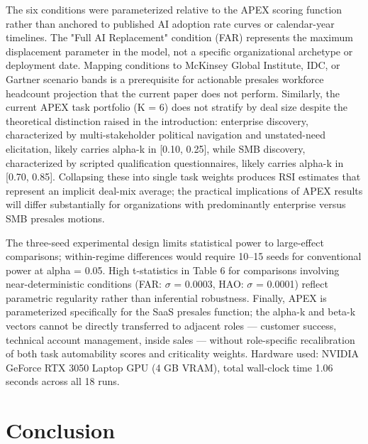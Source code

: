 \documentclass[10pt, conference]{IEEEtran}
\begin{document}
{The six conditions were parameterized relative to the APEX scoring function rather than anchored to published AI adoption rate curves or calendar-year timelines. The "Full AI Replacement" condition (FAR) represents the maximum displacement parameter in the model, not a specific organizational archetype or deployment date. Mapping conditions to McKinsey Global Institute, IDC, or Gartner scenario bands is a prerequisite for actionable presales workforce headcount projection that the current paper does not perform. Similarly, the current APEX task portfolio (K = 6) does not stratify by deal size despite the theoretical distinction raised in the introduction: enterprise discovery, characterized by multi-stakeholder political navigation and unstated-need elicitation, likely carries alpha-k in [0.10, 0.25], while SMB discovery, characterized by scripted qualification questionnaires, likely carries alpha-k in [0.70, 0.85]. Collapsing these into single task weights produces RSI estimates that represent an implicit deal-mix average; the practical implications of APEX results will differ substantially for organizations with predominantly enterprise versus SMB presales motions.

The three-seed experimental design limits statistical power to large-effect comparisons; within-regime differences would require 10--15 seeds for conventional power at alpha = 0.05. High t-statistics in Table 6 for comparisons involving near-deterministic conditions (FAR: $\sigma$ = 0.0003, HAO: $\sigma$ = 0.0001) reflect parametric regularity rather than inferential robustness. Finally, APEX is parameterized specifically for the SaaS presales function; the alpha-k and beta-k vectors cannot be directly transferred to adjacent roles --- customer success, technical account management, inside sales --- without role-specific recalibration of both task automability scores and criticality weights. Hardware used: NVIDIA GeForce RTX 3050 Laptop GPU (4 GB VRAM), total wall-clock time 1.06 seconds across all 18 runs.

\section{Conclusion}

\label{sec:conclusion}

}
\end{document}
